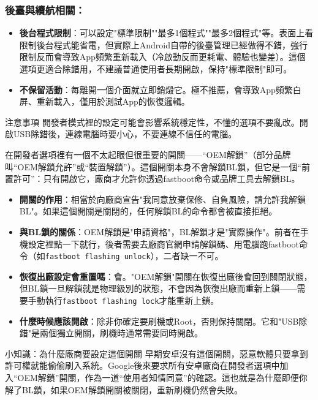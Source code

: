 \subsubsection*{後臺與續航相關：}

\begin{itemize}
  \item \textbf{後台程式限制}：可以設定"標準限制""最多1個程式""最多2個程式"等。表面上看限制後台程式能省電，但實際上Android自帶的後臺管理已經做得不錯，強行限制反而會導致App頻繁重新載入（冷啟動反而更耗電、體驗也變差）。這個選項更適合除錯用，不建議普通使用者長期開啟，保持"標準限制"即可。
  \item \textbf{不保留活動}：每離開一個介面就立即銷燬它。極不推薦，會導致App頻繁白屏、重新載入，僅用於測試App的恢復邏輯。
\end{itemize}

\begin{tcbwarn}{注意事項}
開發者模式裡的設定可能會影響系統穩定性，不懂的選項不要亂改。開啟USB除錯後，連線電腦時要小心，不要連線不信任的電腦。

\end{tcbwarn}


在開發者選項裡有一個不太起眼但很重要的開關——“OEM解鎖”（部分品牌叫“OEM解鎖允許”或“裝置解鎖”）。這個開關本身不會解鎖BL鎖，但它是一個“前置許可”：只有開啟它，廠商才允許你透過fastboot命令或品牌工具去解鎖BL。

\begin{itemize}
  \item \textbf{開關的作用}：相當於向廠商宣告"我同意放棄保修、自負風險，請允許我解鎖BL"。如果這個開關是關閉的，任何解鎖BL的命令都會被直接拒絕。
  \item \textbf{與BL鎖的關係}：OEM解鎖是"申請資格"，BL解鎖才是"實際操作"。前者在手機設定裡點一下就行，後者需要去廠商官網申請解鎖碼、用電腦跑fastboot命令（如\texttt{fastboot flashing unlock}），二者缺一不可。
  \item \textbf{恢復出廠設定會重置嗎}：會。"OEM解鎖"開關在恢復出廠後會回到關閉狀態，但BL鎖一旦解鎖就是物理級別的狀態，不會因為恢復出廠而重新上鎖——需要手動執行\texttt{fastboot flashing lock}才能重新上鎖。
  \item \textbf{什麼時候應該開啟}：除非你確定要刷機或Root，否則保持關閉。它和"USB除錯"是兩個獨立開關，刷機時通常需要同時開啟。
\end{itemize}

\begin{tcbinfo}{小知識：為什麼廠商要設定這個開關}
早期安卓沒有這個開關，惡意軟體只要拿到許可權就能偷偷刷入系統。Google後來要求所有安卓廠商在開發者選項中加入“OEM解鎖”開關，作為一道“使用者知情同意”的確認。這也就是為什麼即便你解了BL鎖，如果OEM解鎖開關被關閉，重新刷機仍然會失敗。

\end{tcbinfo}

